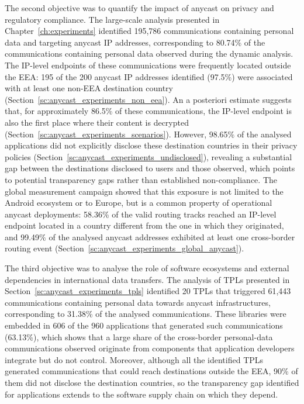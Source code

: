 The second objective was to quantify the impact of anycast on privacy and regulatory compliance. The large-scale analysis presented in Chapter~\ref{ch:experiments} identified 195,786 communications containing personal data and targeting anycast IP addresses, corresponding to 80.74\% of the communications containing personal data observed during the dynamic analysis. The IP-level endpoints of these communications were frequently located outside the EEA: 195 of the 200 anycast IP addresses identified (97.5\%) were associated with at least one non-EEA destination country (Section~\ref{sc:anycast_experiments_non_eea}). An a posteriori estimate suggests that, for approximately 86.5\% of these communications, the IP-level endpoint is also the first place where their content is decrypted (Section~\ref{sc:anycast_experiments_scenarios}). However, 98.65\% of the analysed applications did not explicitly disclose these destination countries in their privacy policies (Section~\ref{sc:anycast_experiments_undisclosed}), revealing a substantial gap between the destinations disclosed to users and those observed, which points to potential transparency gaps rather than established non-compliance. The global measurement campaign showed that this exposure is not limited to the Android ecosystem or to Europe, but is a common property of operational anycast deployments: 58.36\% of the valid routing tracks reached an IP-level endpoint located in a country different from the one in which they originated, and 99.49\% of the analysed anycast addresses exhibited at least one cross-border routing event (Section~\ref{sc:anycast_experiments_global_anycast}).

The third objective was to analyse the role of software ecosystems and external dependencies in international data transfers. The analysis of TPLs presented in Section~\ref{sc:anycast_experiments_tpls} identified 20 TPLs that triggered 61,443 communications containing personal data towards anycast infrastructures, corresponding to 31.38\% of the analysed communications. These libraries were embedded in 606 of the 960 applications that generated such communications (63.13\%), which shows that a large share of the cross-border personal-data communications observed originate from components that application developers integrate but do not control. Moreover, although all the identified TPLs generated communications that could reach destinations outside the EEA, 90\% of them did not disclose the destination countries, so the transparency gap identified for applications extends to the software supply chain on which they depend.

